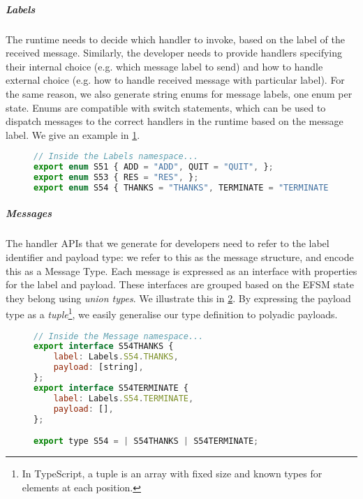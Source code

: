 \subparagraph{Labels}
The runtime needs to decide which handler to invoke, based
on the label of the received message. Similarly, the developer needs
to provide handlers specifying their internal choice (e.g. which
message label to send) and how to handle external choice (e.g. 
how to handle received message with particular label).
For the same reason, we also generate string enums for message labels,
one enum per state. Enums are compatible with switch statements,
which can be used to dispatch messages to the correct handlers
in the runtime based on the message label. 
We give an example in \cref{lst:nodeefsmlabels}.

\begin{figure}[!ht]
\begin{lstlisting}[language=javascript,tabsize=2]
// Inside the Labels namespace...
export enum S51 { ADD = "ADD", QUIT = "QUIT", };
export enum S53 { RES = "RES", };
export enum S54 { THANKS = "THANKS", TERMINATE = "TERMINATE", };
\end{lstlisting}
\label{lst:nodeefsmlabels}
\end{figure}

\subparagraph{Messages}
The handler APIs that we generate for developers
need to refer to the label identifier and payload type: 
we refer to this as the message structure, and encode this as a
Message Type. 
Each message is expressed as an interface with
properties for the label and payload.
These interfaces are grouped based on the EFSM state
they belong using \textit{union types}.
We illustrate this in \cref{lst:addersvrmsg}.
By expressing the payload type as a \textit{tuple}\footnote{
In TypeScript, a tuple is an array with fixed size
and known types for elements at each position.
},
we easily generalise our type definition to polyadic payloads.

\begin{figure}[!ht]
\begin{lstlisting}[language=javascript, tabsize=2]
// Inside the Message namespace...
export interface S54THANKS {
	label: Labels.S54.THANKS,
	payload: [string],
};
export interface S54TERMINATE {
	label: Labels.S54.TERMINATE,
	payload: [],
};

export type S54 = | S54THANKS | S54TERMINATE;
\end{lstlisting}
\label{lst:addersvrmsg}
\end{figure}

